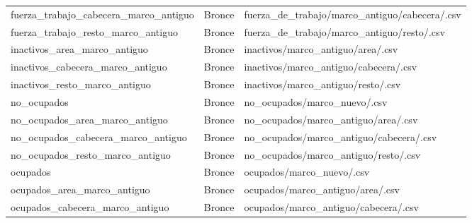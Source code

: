\begin{longtable}{
        >{\raggedright\arraybackslash\ttfamily\footnotesize}p{6.0cm}
        >{\centering\arraybackslash}p{1.4cm}
        >{\raggedright\arraybackslash\ttfamily\footnotesize}p{5.6cm}
    }
    fuerza\_\allowbreak trabajo\_\allowbreak cabecera\_\allowbreak marco\_\allowbreak antiguo & Bronce &
        fuerza\_\allowbreak de\_\allowbreak trabajo/\allowbreak marco\_\allowbreak antiguo/\allowbreak cabecera/\allowbreak *.csv \\
    fuerza\_\allowbreak trabajo\_\allowbreak resto\_\allowbreak marco\_\allowbreak antiguo & Bronce &
        fuerza\_\allowbreak de\_\allowbreak trabajo/\allowbreak marco\_\allowbreak antiguo/\allowbreak resto/\allowbreak *.csv \\
    inactivos\_\allowbreak area\_\allowbreak marco\_\allowbreak antiguo & Bronce &
        inactivos/\allowbreak marco\_\allowbreak antiguo/\allowbreak area/\allowbreak *.csv \\
    inactivos\_\allowbreak cabecera\_\allowbreak marco\_\allowbreak antiguo & Bronce &
        inactivos/\allowbreak marco\_\allowbreak antiguo/\allowbreak cabecera/\allowbreak *.csv \\
    inactivos\_\allowbreak resto\_\allowbreak marco\_\allowbreak antiguo & Bronce &
        inactivos/\allowbreak marco\_\allowbreak antiguo/\allowbreak resto/\allowbreak *.csv \\
    no\_\allowbreak ocupados & Bronce &
        no\_\allowbreak ocupados/\allowbreak marco\_\allowbreak nuevo/\allowbreak *.csv \\
    no\_\allowbreak ocupados\_\allowbreak area\_\allowbreak marco\_\allowbreak antiguo & Bronce &
        no\_\allowbreak ocupados/\allowbreak marco\_\allowbreak antiguo/\allowbreak area/\allowbreak *.csv \\
    no\_\allowbreak ocupados\_\allowbreak cabecera\_\allowbreak marco\_\allowbreak antiguo & Bronce &
        no\_\allowbreak ocupados/\allowbreak marco\_\allowbreak antiguo/\allowbreak cabecera/\allowbreak *.csv \\
    no\_\allowbreak ocupados\_\allowbreak resto\_\allowbreak marco\_\allowbreak antiguo & Bronce &
        no\_\allowbreak ocupados/\allowbreak marco\_\allowbreak antiguo/\allowbreak resto/\allowbreak *.csv \\
    ocupados & Bronce &
        ocupados/\allowbreak marco\_\allowbreak nuevo/\allowbreak *.csv \\
    ocupados\_\allowbreak area\_\allowbreak marco\_\allowbreak antiguo & Bronce &
        ocupados/\allowbreak marco\_\allowbreak antiguo/\allowbreak area/\allowbreak *.csv \\
    ocupados\_\allowbreak cabecera\_\allowbreak marco\_\allowbreak antiguo & Bronce &
        ocupados/\allowbreak marco\_\allowbreak antiguo/\allowbreak cabecera/\allowbreak *.csv \\

\end{longtable}
